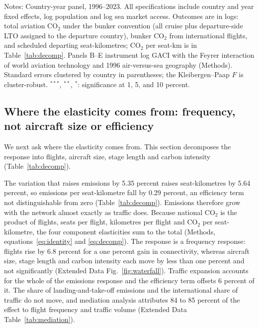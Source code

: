 \documentclass[12pt]{extarticle}
\begin{document}
\begin{table}[H]
{\begin{threeparttable}
\begin{tabular}{lccc}
\bottomrule
\end{tabular}
\begin{tablenotes}[flushleft]
\footnotesize
\item Notes: Country-year panel, 1996--2023. All specifications include country and year fixed effects, log population and log sea market access. Outcomes are in logs: total aviation CO$_2$ under the bunker convention (all cruise plus departure-side LTO assigned to the departure country), bunker CO$_2$ from international flights, and scheduled departing seat-kilometres; CO$_2$ per seat-km is in Table~\ref{tab:decomp}. Panels B--E instrument log GACI with the Feyrer interaction of world aviation technology and 1996 air-versus-sea geography (Methods). Standard errors clustered by country in parentheses; the Kleibergen--Paap $F$ is cluster-robust. $^{***}$, $^{**}$, $^{*}$: significance at 1, 5, and 10 percent.
\end{tablenotes}
\end{threeparttable}}
\end{table}

\subsection*{Where the elasticity comes from: frequency, not aircraft size
or efficiency}
We next ask where the elasticity comes from. This section decomposes the
response into flights, aircraft size, stage length and carbon intensity
(Table~\ref{tab:decomp}).

The variation that raises emissions by 5.35 percent raises
seat-kilometres by 5.64 percent, so emissions per seat-kilometre fall by
0.29 percent, an efficiency term not distinguishable from zero
(Table~\ref{tab:decomp}). Emissions therefore grow with the network
almost exactly as traffic does. Because national CO$_2$ is the product of
flights, seats per flight, kilometres per flight and CO$_2$ per
seat-kilometre, the four component elasticities sum to the total
(Methods, equations~\ref{eq:identity} and \ref{eq:decomp}). The response is a frequency response: flights rise by 6.8
percent for a one percent gain in connectivity, whereas aircraft size,
stage length and carbon intensity each move by less than one percent and
not significantly (Extended Data Fig.~\ref{fig:waterfall}). Traffic
expansion accounts for the whole of the emissions response and the
efficiency term offsets 6 percent of it. The share of
landing-and-take-off emissions and the international share of traffic do
not move, and mediation analysis attributes 84 to 85 percent of the effect
to flight frequency and traffic volume (Extended Data
Table~\ref{tab:mediation}).
\end{document}
